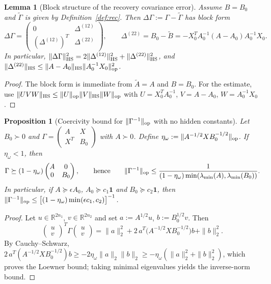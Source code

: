 \documentclass[11pt]{article}
\newtheorem{lemma}[theorem]{Lemma}
\newtheorem{proposition}[theorem]{Proposition}
\theoremstyle{remark}
\newcommand{\HS}{{\rm HS}}
\newcommand{\op}{{\rm op}}
\begin{document}
\begin{lemma}[Block structure of the recovery covariance error]
\label{lem:block}
Assume $B = B_0$ and $\tilde\Gamma$ is given by Definition~\ref{def:rec}.
Then $\Delta\Gamma := \Gamma - \tilde\Gamma$ has block form
\[
\Delta\Gamma = \begin{pmatrix} 0 & \Delta^{(12)} \\
(\Delta^{(12)})^T & \Delta^{(22)} \end{pmatrix},
\qquad
\Delta^{(22)} = B_0 - \tilde B = -X_0^T A_0^{-1}(A - A_0)A_0^{-1} X_0 .
\]
In particular,
$\|\Delta\Gamma\|_\HS^2 = 2\|\Delta^{(12)}\|_\HS^2 + \|\Delta^{(22)}\|_\HS^2$,
and
$\|\Delta^{(22)}\|_\HS \le \|A - A_0\|_\HS \|A_0^{-1}X_0\|_\op^2$.
\end{lemma}
\begin{proof}
The block form is immediate from $\tilde A = A$ and $B = B_0$. For the
estimate, use $\|UVW\|_\HS \le \|U\|_\op \|V\|_\HS \|W\|_\op$ with
$U = X_0^T A_0^{-1}$, $V = A - A_0$, $W = A_0^{-1}X_0$.
\end{proof}

\begin{proposition}[Coercivity bound for $\|\Gamma^{-1}\|_\op$ with no hidden
constants]
\label{prop:coerc}
Let $B_0 \succ 0$ and $\Gamma = \begin{pmatrix} A & X \\ X^T & B_0
\end{pmatrix}$ with $A \succ 0$. Define
$\eta_\omega := \|A^{-1/2} X B_0^{-1/2}\|_\op$. If $\eta_\omega < 1$, then
\[
\Gamma \succeq (1 - \eta_\omega)
\begin{pmatrix} A & 0 \\ 0 & B_0 \end{pmatrix},
\qquad\text{hence}\qquad
\|\Gamma^{-1}\|_\op \le
\frac{1}{(1-\eta_\omega)\min(\lambda_{\min}(A), \lambda_{\min}(B_0))}.
\]
In particular, if $A \succeq \epsilon A_0$, $A_0 \succeq c_1\mathbf{1}$ and
$B_0 \succeq c_2\mathbf{1}$, then
$\|\Gamma^{-1}\|_\op \le \bigl[(1-\eta_\omega)\min(\epsilon c_1, c_2)\bigr]^{-1}$.
\end{proposition}
\begin{proof}
Let $u \in \mathbb{R}^{2n_1}$, $v \in \mathbb{R}^{2n_2}$ and set
$a := A^{1/2}u$, $b := B_0^{1/2}v$. Then
\[
\begin{pmatrix} u \\ v \end{pmatrix}^{\!T}
\Gamma
\begin{pmatrix} u \\ v \end{pmatrix}
= \|a\|_2^2 + 2\, a^T \bigl(A^{-1/2} X B_0^{-1/2}\bigr) b + \|b\|_2^2 .
\]
By Cauchy--Schwarz,
$2\, a^T (A^{-1/2}XB_0^{-1/2}) b \ge -2\eta_\omega \|a\|_2 \|b\|_2 \ge
-\eta_\omega(\|a\|_2^2 + \|b\|_2^2)$, which proves the Loewner bound; taking
minimal eigenvalues yields the inverse-norm bound.
\end{proof}
\end{document}
